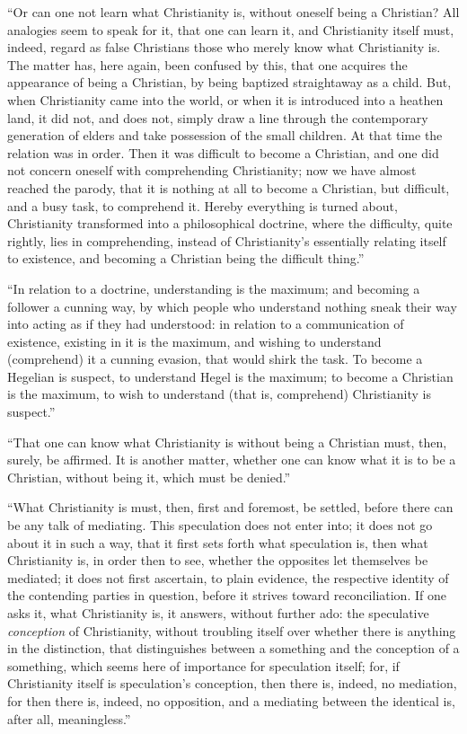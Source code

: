 \documentclass[12pt]{book}
\begin{document}
``Or can one not learn what Christianity is, without oneself being a Christian? All analogies seem to speak for it, that one can learn it, and Christianity itself must, indeed, regard as false Christians those who merely know what Christianity is. The matter has, here again, been confused by this, that one acquires the appearance of being a Christian, by being baptized straightaway as a child. But, when Christianity came into the world, or when it is introduced into a heathen land, it did not, and does not, simply draw a line through the contemporary generation of elders and take possession of the small children. At that time the relation was in order. Then it was difficult to become a Christian, and one did not concern oneself with comprehending Christianity; now we have almost reached the parody, that it is nothing at all to become a Christian, but difficult, and a busy task, to comprehend it. Hereby everything is turned about, Christianity transformed into a philosophical doctrine, where the difficulty, quite rightly, lies in comprehending, instead of Christianity's essentially relating itself to existence, and becoming a Christian being the difficult thing.''

``In relation to a doctrine, understanding is the
maximum; and becoming a follower a cunning way, by which people who understand nothing sneak their way into acting as if they had understood: in relation to a communication of existence, existing in it is the maximum, and wishing to understand (comprehend) it a cunning evasion, that would shirk the task. To become a Hegelian is suspect, to understand Hegel is the maximum; to become a Christian is the maximum, to wish to understand (that is, comprehend) Christianity is suspect.''

``That one can know what Christianity is without being a Christian must, then, surely, be affirmed. It is another matter, whether one can know what it is to be a Christian, without being it, which must be denied.''

``What Christianity is must, then, first and foremost, be settled, before there can be any talk of mediating. This speculation does not enter into; it does not go about it in such a way, that it first sets forth what speculation is, then what Christianity is, in order then to see, whether the opposites let themselves be mediated; it does not first ascertain, to plain evidence, the respective identity of the contending parties in question, before it strives toward reconciliation. If one asks it, what Christianity is, it answers, without further ado: the speculative \emph{conception} of Christianity, without troubling itself over whether there is anything in the distinction, that distinguishes between a something and the conception of a something, which seems here of importance for speculation itself; for, if Christianity itself is speculation's conception, then there is, indeed, no
mediation, for then there is, indeed, no opposition, and a mediating between the identical is, after all, meaningless.''
\end{document}
